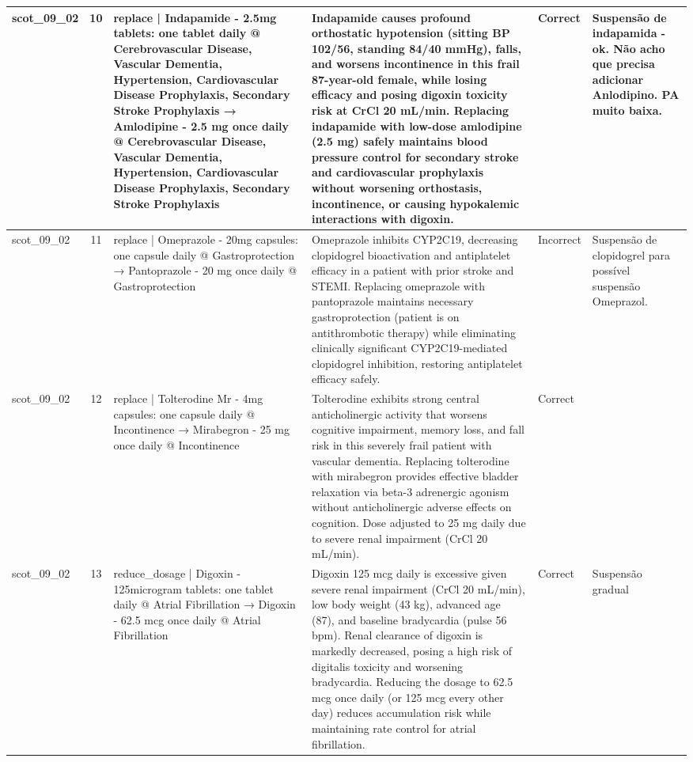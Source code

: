 \begin{longtable}{|p{1.45cm}|c|p{3.3cm}|p{6.5cm}|p{1.55cm}|p{2.3cm}|}
scot\_09\_02 & 10 & replace | Indapamide - 2.5mg tablets: one tablet daily @ Cerebrovascular Disease, Vascular Dementia, Hypertension, Cardiovascular Disease Prophylaxis, Secondary Stroke Prophylaxis → Amlodipine - 2.5 mg once daily @ Cerebrovascular Disease, Vascular Dementia, Hypertension, Cardiovascular Disease Prophylaxis, Secondary Stroke Prophylaxis & Indapamide causes profound orthostatic hypotension (sitting BP 102/56, standing 84/40 mmHg), falls, and worsens incontinence in this frail 87-year-old female, while losing efficacy and posing digoxin toxicity risk at CrCl 20 mL/min. Replacing indapamide with low-dose amlodipine (2.5 mg) safely maintains blood pressure control for secondary stroke and cardiovascular prophylaxis without worsening orthostasis, incontinence, or causing hypokalemic interactions with digoxin. & Correct & Suspensão de indapamida - ok. Não acho que precisa adicionar Anlodipino. PA muito baixa. \\
\hline
scot\_09\_02 & 11 & replace | Omeprazole - 20mg capsules: one capsule daily @ Gastroprotection → Pantoprazole - 20 mg once daily @ Gastroprotection & Omeprazole inhibits CYP2C19, decreasing clopidogrel bioactivation and antiplatelet efficacy in a patient with prior stroke and STEMI. Replacing omeprazole with pantoprazole maintains necessary gastroprotection (patient is on antithrombotic therapy) while eliminating clinically significant CYP2C19-mediated clopidogrel inhibition, restoring antiplatelet efficacy safely. & Incorrect & Suspensão de clopidogrel para possível suspensão Omeprazol. \\
\hline
scot\_09\_02 & 12 & replace | Tolterodine Mr - 4mg capsules: one capsule daily @ Incontinence → Mirabegron - 25 mg once daily @ Incontinence & Tolterodine exhibits strong central anticholinergic activity that worsens cognitive impairment, memory loss, and fall risk in this severely frail patient with vascular dementia. Replacing tolterodine with mirabegron provides effective bladder relaxation via beta-3 adrenergic agonism without anticholinergic adverse effects on cognition. Dose adjusted to 25 mg daily due to severe renal impairment (CrCl 20 mL/min). & Correct &  \\
\hline
scot\_09\_02 & 13 & reduce\_dosage | Digoxin - 125microgram tablets: one tablet daily @ Atrial Fibrillation → Digoxin - 62.5 mcg once daily @ Atrial Fibrillation & Digoxin 125 mcg daily is excessive given severe renal impairment (CrCl 20 mL/min), low body weight (43 kg), advanced age (87), and baseline bradycardia (pulse 56 bpm). Renal clearance of digoxin is markedly decreased, posing a high risk of digitalis toxicity and worsening bradycardia. Reducing the dosage to 62.5 mcg once daily (or 125 mcg every other day) reduces accumulation risk while maintaining rate control for atrial fibrillation. & Correct & Suspensão gradual \\

\end{longtable}
